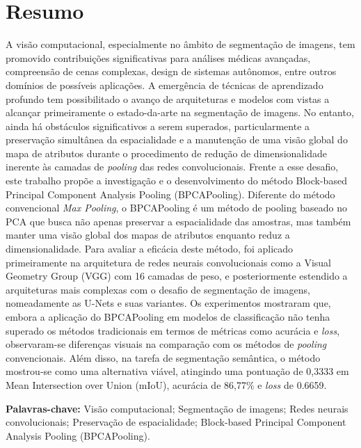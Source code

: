 \section*{Resumo}
\thispagestyle{empty}
\makeatletter
\makeatother
A visão computacional, especialmente no âmbito de segmentação de imagens, tem promovido contribuições significativas para análises médicas avançadas, compreensão de cenas complexas, design de sistemas autônomos, entre outros domínios de possíveis aplicações. A emergência de técnicas de aprendizado profundo tem possibilitado o avanço de arquiteturas e modelos com vistas a alcançar primeiramente o estado-da-arte na segmentação de imagens.
No entanto, ainda há obstáculos significativos a serem superados, particularmente a preservação simultânea da espacialidade e a manutenção de uma visão global do mapa de atributos durante o procedimento de redução de dimensionalidade inerente às camadas de \textit{pooling} das redes convolucionais.
Frente a esse desafio, este trabalho propõe a investigação e o desenvolvimento do método Block-based Principal Component Analysis Pooling (BPCAPooling). Diferente do método convencional \textit{Max Pooling}, o BPCAPooling é um método de pooling baseado no PCA que busca não apenas preservar a espacialidade das amostras, mas também manter uma visão global dos mapas de atributos enquanto reduz a dimensionalidade.
Para avaliar a eficácia deste método, foi aplicado primeiramente na arquitetura de redes neurais convolucionais como a Visual Geometry Group (VGG) com 16 camadas de peso, e posteriormente estendido a arquiteturas mais complexas com o desafio de segmentação de imagens, nomeadamente as U-Nets e suas variantes.
Os experimentos mostraram que, embora a aplicação do BPCAPooling em modelos de classificação não tenha superado os métodos tradicionais em termos de métricas como acurácia e \textit{loss}, observaram-se diferenças visuais na comparação com os métodos de \textit{pooling} convencionais. Além disso, na tarefa de segmentação semântica, o método mostrou-se como uma alternativa viável, atingindo uma pontuação de 0,3333 em Mean Intersection over Union (mIoU), acurácia de 86,77\% e \textit{loss} de 0.6659.

\textbf{Palavras-chave:} Visão computacional; Segmentação de imagens; Redes neurais convolucionais; Preservação de espacialidade; Block-based Principal Component Analysis Pooling (BPCAPooling).